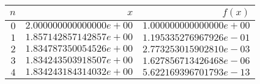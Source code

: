 \begin{tabular}{| r | r | r |}
\hline
$n$ & $x$ & $f(x)$\\
\hline
$   0$ & $  2.000000000000000e+00$ & $  1.000000000000000e+00$\\
$   1$ & $  1.857142857142857e+00$ & $  1.195335276967926e-01$\\
$   2$ & $  1.834787350054526e+00$ & $  2.773253015902810e-03$\\
$   3$ & $  1.834243503918507e+00$ & $  1.627856713426468e-06$\\
$   4$ & $  1.834243184314032e+00$ & $  5.622169396701793e-13$\\
\hline
\end{tabular}
